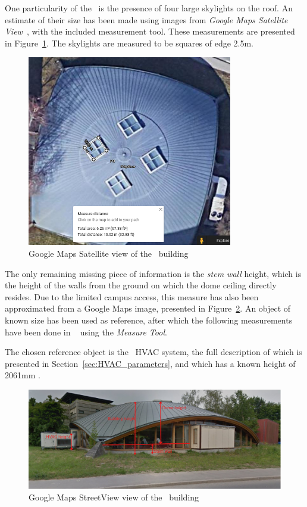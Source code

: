 One particularity of the \pdome\  is the presence of four large skylights on the
roof. An estimate of their size has been made using images from \textit{Google
Maps Satellite View}~\cite{GoogleMaps}, with the included measurement tool. These
measurements are presented in Figure~\ref{fig:Google_Maps_Skylights}. The
skylights are measured to be squares of edge 2.5m.

\begin{figure}[ht]
    \centering
    \includegraphics[width = 0.8\textwidth]{Images/google_maps_polydome_skylights}
    \caption{Google Maps Satellite view of the \pdome\ building}
    \label{fig:Google_Maps_Skylights}
\end{figure}

The only remaining missing piece of information is the \textit{stem wall}
height, which is the height of the walls from the ground on which the dome
ceiling directly resides. Due to the limited campus access, this measure has
also been approximated from a Google Maps image, presented in
Figure~\ref{fig:Google_Maps_Streetview}. An object of known size has been used
as reference, after which the following measurements have been done in
~\cite{kimballGIMPGNUImage} using the
\textit{Measure Tool}.

The chosen reference object is the \pdome\ HVAC system, the full description of
which is presented in Section~\ref{sec:HVAC_parameters}, and which has a known
height of 2061mm \cite{aermecRoofTopManuelSelection}.

\begin{figure}[ht]
    \centering
    \includegraphics[width = \textwidth]{Images/polydome_streetview_annotated}
    \caption{Google Maps StreetView view of the \pdome\ building}
    \label{fig:Google_Maps_Streetview}
\end{figure}

